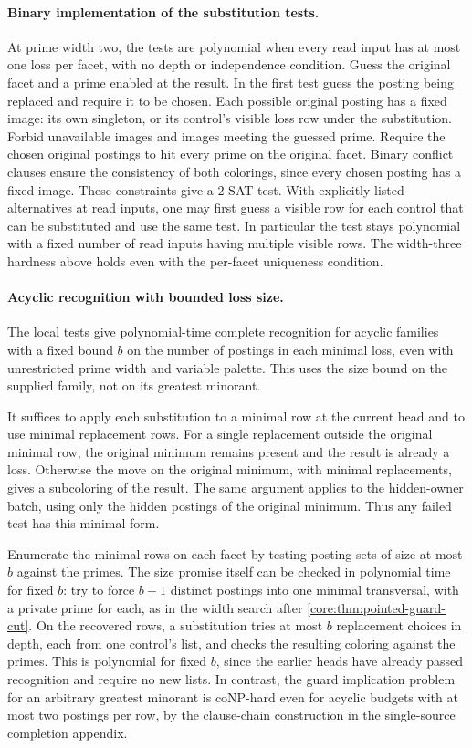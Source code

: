\paragraph{Binary implementation of the substitution tests.}
At prime width two, the tests are polynomial
when every read input has at most one loss
per facet, with no depth or independence
condition. Guess the original facet and a
prime enabled at the result. In the first
test guess the posting being replaced and
require it to be chosen. Each possible
original posting has a fixed image: its
own singleton, or its control's visible
loss row under the substitution. Forbid
unavailable images and images meeting the
guessed prime. Require the chosen original
postings to hit every prime on the original
facet. Binary conflict clauses ensure the
consistency of both colorings, since every
chosen posting has a fixed image. These
constraints give a $2$-SAT test.
With explicitly listed alternatives at
read inputs, one may first guess a visible
row for each control that can be substituted
and use the same test. In particular the
test stays polynomial with a fixed number
of read inputs having multiple visible rows.
The width-three hardness above holds even
with the per-facet uniqueness condition.

\paragraph{Acyclic recognition with bounded loss size.}
The local tests give polynomial-time complete
recognition for acyclic families with a fixed
bound $b$ on the number of postings in each
minimal loss, even with unrestricted prime width
and variable palette. This uses the size bound
on the supplied family, not on its greatest
minorant.

It suffices to apply each substitution to a
minimal row at the current head and to use
minimal replacement rows. For a single
replacement outside the original minimal row,
the original minimum remains present and the
result is already a loss. Otherwise the move
on the original minimum, with minimal
replacements, gives a subcoloring of the
result. The same argument applies to the
hidden-owner batch, using only the hidden
postings of the original minimum. Thus any
failed test has this minimal form.

Enumerate the minimal rows on each facet by
testing posting sets of size at most $b$ against
the primes. The size promise itself can be
checked in polynomial time for fixed $b$:
try to force $b+1$ distinct postings into
one minimal transversal, with a private prime
for each, as in the width search after
\cref{core:thm:pointed-guard-cut}. On the
recovered rows, a substitution tries at most
$b$ replacement choices in depth, each from
one control's list, and checks the resulting
coloring against the primes. This is polynomial
for fixed $b$, since the earlier heads have
already passed recognition and require no
new lists. In contrast, the guard implication
problem for an arbitrary greatest minorant
is coNP-hard even for acyclic budgets with
at most two postings per row, by the
clause-chain construction in the single-source
completion appendix.

